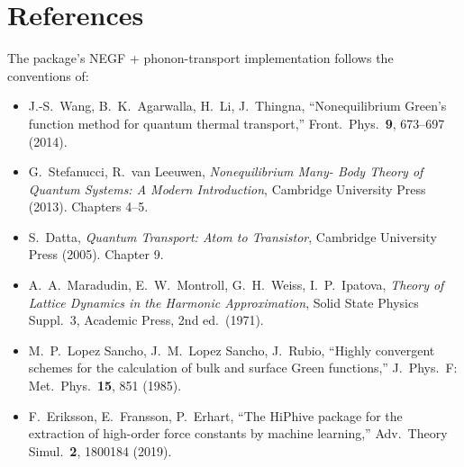 \section{References}
\label{ap:fa_refs}

The package's NEGF + phonon-transport implementation follows the
conventions of:
\begin{itemize}
  \item J.-S.\ Wang, B.\ K.\ Agarwalla, H.\ Li, J.\ Thingna,
    ``Nonequilibrium Green's function method for quantum thermal
    transport,'' Front.\ Phys.\ \textbf{9}, 673--697 (2014).
  \item G.\ Stefanucci, R.\ van Leeuwen, \emph{Nonequilibrium Many-
    Body Theory of Quantum Systems: A Modern Introduction},
    Cambridge University Press (2013).  Chapters 4–5.
  \item S.\ Datta, \emph{Quantum Transport: Atom to Transistor},
    Cambridge University Press (2005).  Chapter 9.
  \item A.\ A.\ Maradudin, E.\ W.\ Montroll, G.\ H.\ Weiss,
    I.\ P.\ Ipatova, \emph{Theory of Lattice Dynamics in the Harmonic
    Approximation}, Solid State Physics Suppl.\ 3, Academic Press,
    2nd ed.\ (1971).
  \item M.\ P.\ Lopez Sancho, J.\ M.\ Lopez Sancho, J.\ Rubio,
    ``Highly convergent schemes for the calculation of bulk and
    surface Green functions,'' J.\ Phys.\ F: Met.\ Phys.\
    \textbf{15}, 851 (1985).
  \item F.\ Eriksson, E.\ Fransson, P.\ Erhart, ``The HiPhive
    package for the extraction of high-order force constants by
    machine learning,'' Adv.\ Theory Simul.\ \textbf{2}, 1800184 (2019).
\end{itemize}
